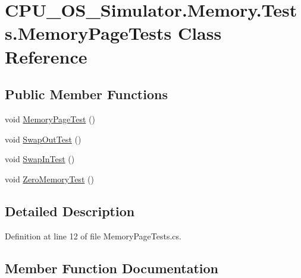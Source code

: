 \hypertarget{class_c_p_u___o_s___simulator_1_1_memory_1_1_tests_1_1_memory_page_tests}{}\section{C\+P\+U\+\_\+\+O\+S\+\_\+\+Simulator.\+Memory.\+Tests.\+Memory\+Page\+Tests Class Reference}
\label{class_c_p_u___o_s___simulator_1_1_memory_1_1_tests_1_1_memory_page_tests}
\subsection*{Public Member Functions}
\begin{DoxyCompactItemize}
\item 
void \hyperlink{class_c_p_u___o_s___simulator_1_1_memory_1_1_tests_1_1_memory_page_tests_a5dd24d4a39172f2a347e7106c806fa89}{Memory\+Page\+Test} ()
\item 
void \hyperlink{class_c_p_u___o_s___simulator_1_1_memory_1_1_tests_1_1_memory_page_tests_ad05389a6c85964130902bd4f64e5d097}{Swap\+Out\+Test} ()
\item 
void \hyperlink{class_c_p_u___o_s___simulator_1_1_memory_1_1_tests_1_1_memory_page_tests_a67f2a05fc4c4c02991dd9d14348230cf}{Swap\+In\+Test} ()
\item 
void \hyperlink{class_c_p_u___o_s___simulator_1_1_memory_1_1_tests_1_1_memory_page_tests_aa7b9c0c2148fe416facbb7588d729566}{Zero\+Memory\+Test} ()
\end{DoxyCompactItemize}


\subsection{Detailed Description}


Definition at line 12 of file Memory\+Page\+Tests.\+cs.



\subsection{Member Function Documentation}
\hypertarget{class_c_p_u___o_s___simulator_1_1_memory_1_1_tests_1_1_memory_page_tests_a5dd24d4a39172f2a347e7106c806fa89}{}
